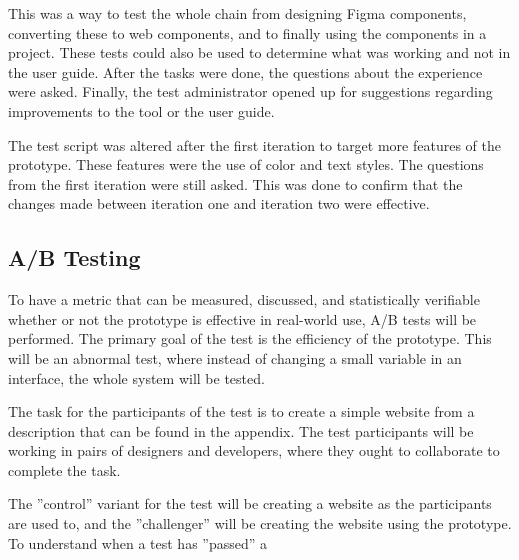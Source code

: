 This was a way to test the whole chain from designing Figma components, converting these to web components, and to finally using the components in a project. These tests could also be used to determine what was working and not in the user guide. After the tasks were done, the questions about the experience were asked. Finally, the test administrator opened up for suggestions regarding improvements to the tool or the user guide. 

The test script was altered after the first iteration to target more features of the prototype. These features were the use of color and text styles. The questions from the first iteration were still asked. This was done to confirm that the changes made between iteration one and iteration two were effective. 







\subsection{ A/B Testing }%
\label{sub:ab-testing}

To have a metric that can be measured, discussed, and statistically verifiable whether or not the prototype is effective in real-world use, A/B tests will be performed.  The primary goal of the test is the efficiency of the prototype. This will be an abnormal test, where instead of changing a small variable in an interface, the whole system will be tested. 

The task for the participants of the test is to create a simple website from a description that can be found in the appendix. The test participants will be working in pairs of designers and developers, where they ought to collaborate to complete the task. 

The ''control'' variant for the test will be creating a website as the participants are used to, and the ''challenger'' will be creating the website using the prototype. To understand when a test has ''passed'' a 


